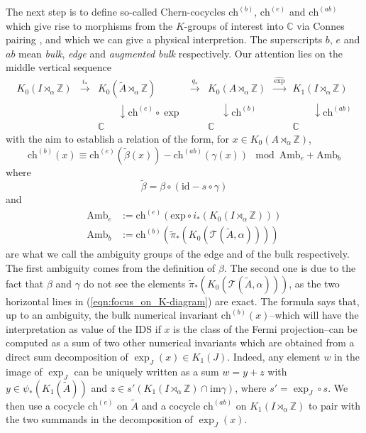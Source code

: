 \documentclass[11pt]{amsart}
\newcommand{\Z}{\mathbb{Z}}
\newcommand{\C}{\mathbb{C}}
\newcommand{\chb}{\text{ch}^{(b)}}
\newcommand{\che}{\text{ch}^{(e)}}
\newcommand{\chab}{\text{ch}^{(ab)}}
\renewcommand{\b}{\psi}
\begin{document}
The next step is to define so-called Chern-cocycles
$\chb$, $\che$ and $\chab$ which give rise to morphisms from the $K$-groups of interest into $\C$ via Connes pairing \cite{connes1994noncommutative,prodan2016bulk}, and which we can give a physical interpretion. The superscripts $b$, $e$ and $ab$ mean \textit{bulk}, \textit{edge} and \textit{augmented bulk} respectively. Our attention lies on the middle vertical sequence
\begin{equation}\label{eqn:K-vertical}
\begin{matrix}
K_0(I \rtimes_\alpha \mathbb{Z}) & \stackrel{i_*}\to &
 K_0(\tilde A \rtimes_\alpha \mathbb{Z}) &  \stackrel{q_*}\to &
K_0(A \rtimes_\alpha \mathbb{Z}) &  \stackrel{\hat\exp}\to & 
K_1(I \rtimes_\alpha \mathbb{Z})\\
 & &\:\:\:\:\:\:\:\:\: \downarrow \che\!\circ\exp & &\:\:\:\:\:\: \downarrow \chb & &\:\:\:\:\:\:\:\:\: \downarrow \chab  \\
 & &\!\!\!\!\!\!\!\!\!\!\!\!\!\!\!\!\!\!\!\!\!\C  & & \!\!\!\!\!\!\!\!\!\!\!\!\!\C  & & \!\!\!\!\!\!\!\!\!\!\!\!\C
\end{matrix}
\end{equation}
with the aim to establish a relation of the form, for $x\in K_0(A \rtimes_\alpha \mathbb{Z})$, 
\begin{equation}\label{theFormula}
	\chb(x) \equiv \che(\tilde\beta(x))-\chab(\gamma(x))\mod{\mathrm{Amb}_e+\mathrm{Amb}_b}
\end{equation}
where 
$$\tilde\beta  = \beta\circ (\mathrm{id}-s\circ \gamma) $$
and
\begin{align*}
	\mathrm{Amb}_e &:= \che(\mathrm{exp}\circ i_*(K_0(I \rtimes_\alpha \mathbb{Z})))\\
	\mathrm{Amb}_b &:= \chb(\tilde{\pi}_*(K_0(\mathcal{T}(\tilde{A}, \alpha))))
\end{align*}
are what we call the ambiguity groups of the edge and of the bulk respectively. The first ambiguity comes from the definition of $\beta$. The second one is due to the fact that $\beta$ and $\gamma$ do not see the elements $\tilde{\pi}_*(K_0(\mathcal{T}(\tilde{A}, \alpha)))$, as the two horizontal lines in (\ref{eqn:focus_on_K-diagram}) are exact.  
The formula says that, up to an ambiguity, the bulk numerical invariant
$\chb(x)$--which will have the interpretation as value of the IDS if $x$ is the class of the Fermi projection--can be computed as a sum of two other numerical invariants which are obtained from a direct sum decomposition of $\exp_J(x)\in K_1(J)$. Indeed, any element $w$ in the image of $\exp_J$ can be uniquely written as a sum $w=y+z$ with $y\in \b_*(K_1(\tilde A))$ and $z\in s'(K_1(I\rtimes_\alpha\Z)\cap \mathrm{im} \gamma)$, where $s' = \exp_J\circ s$.
We then use a cocycle $\che$ on $\tilde A$ and a cocycle 
$\chab$ on $K_1(I\rtimes_\alpha\Z)$ to pair with the two summands in the decomposition of $\exp_J(x)$.
\end{document}
